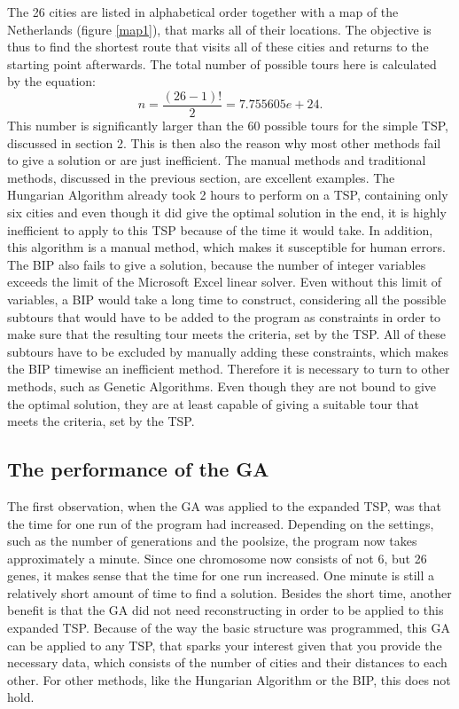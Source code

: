 The 26 cities are listed in alphabetical order together with a map of the Netherlands (figure \ref{map1}), that marks all of their locations. The objective is thus to find the shortest route that visits all of these cities and returns to the starting point afterwards. The total number of possible tours here is calculated by the equation: %
\[n = \frac{(26-1)!}{2} =  7.755605e+24.\]
This number is significantly larger than the 60 possible tours for the simple TSP, discussed in section 2. This is then also the reason why most other methods fail to give a solution or are just inefficient. The manual methods and traditional methods, discussed in the previous section, are excellent examples. The Hungarian Algorithm already took 2 hours to perform on a TSP, containing only six cities and even though it did give the optimal solution in the end, it is highly inefficient to apply to this TSP because of the time it would take. In addition, this algorithm is a manual method, which makes it susceptible for human errors. The BIP also fails to give a solution, because the number of integer variables exceeds the limit of the Microsoft Excel linear solver. Even without this limit of variables, a BIP would take a long time to construct, considering all the possible subtours that would have to be added to the program as constraints in order to make sure that the resulting tour meets the criteria, set by the TSP. All of these subtours have to be excluded by manually adding these constraints, which makes the BIP timewise an inefficient method. Therefore it is necessary to turn to other methods, such as Genetic Algorithms. Even though they are not bound to give the optimal solution, they are at least capable of giving a suitable tour that meets the criteria, set by the TSP.

\subsection{The performance of the GA} %
\par
The first observation, when the GA was applied to the expanded TSP, was that the time for one run of the program had increased. Depending on the settings, such as the number of generations and the poolsize, the program now takes approximately a minute. Since one chromosome now consists of not 6, but 26 genes, it makes sense that the time for one run increased. One minute is still a relatively short amount of time to find a solution. Besides the short time, another benefit is that the GA did not need reconstructing in order to be applied to this expanded TSP. Because of the way the basic structure was programmed, this GA can be applied to any TSP, that sparks your interest given that you provide the necessary data, which consists of the number of cities and their distances to each other. For other methods, like the Hungarian Algorithm or the BIP, this does not hold. 

